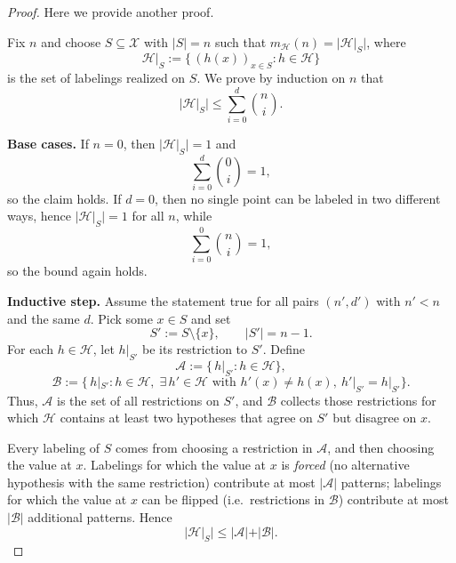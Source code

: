 \documentclass[../main]{subfiles}
\begin{document}
\begin{proof}
    Here we provide another proof.
    
    Fix $n$ and choose $S \subseteq \mathcal{X}$ with $|S|=n$
    such that $m_{\mathcal{H}}(n)=|\mathcal{H}|_S|$, where
    \begin{equation}
        \mathcal{H}|_S
        := \{\, (h(x))_{x\in S} : h\in\mathcal{H} \}
    \end{equation}
    is the set of labelings realized on $S$.
    We prove by induction on $n$ that
    \begin{equation}
        |\mathcal{H}|_S|
        \le \sum_{i=0}^{d} \binom{n}{i}.
    \end{equation}
    
    \textbf{Base cases.}
    If $n=0$, then $|\mathcal{H}|_S|=1$ and
    \begin{equation}
        \sum_{i=0}^{d} \binom{0}{i} = 1,
    \end{equation}
    so the claim holds.
    If $d=0$, then no single point can be labeled in two different ways,
    hence $|\mathcal{H}|_S|=1$ for all $n$, while
    \begin{equation}
        \sum_{i=0}^{0} \binom{n}{i} = 1,
    \end{equation}
    so the bound again holds.
    
    \textbf{Inductive step.}
    Assume the statement true for all pairs $(n',d')$ with $n' < n$
    and the same $d$. Pick some $x \in S$ and set
    \begin{equation}
        S' := S \setminus \{x\}, \qquad |S'| = n-1.
    \end{equation}
    For each $h\in\mathcal{H}$, let $h|_{S'}$ be its restriction to $S'$.
    Define
    \begin{equation}
        \mathcal{A}
        := \{\, h|_{S'} : h\in\mathcal{H} \},
    \end{equation}
    \begin{equation}
        \mathcal{B}
        := \bigl\{\, h|_{S'} : h\in\mathcal{H},\;
            \exists\,h' \in \mathcal{H}
            \text{ with } h'(x)\neq h(x),\ h'|_{S'}=h|_{S'} \bigr\}.
    \end{equation}
    Thus, $\mathcal{A}$ is the set of all restrictions on $S'$,
    and $\mathcal{B}$ collects those restrictions for which
    $\mathcal{H}$ contains at least two hypotheses that agree on $S'$
    but disagree on $x$.
    
    Every labeling of $S$ comes from choosing a restriction in $\mathcal{A}$,
    and then choosing the value at $x$.
    Labelings for which the value at $x$ is \emph{forced} (no alternative
    hypothesis with the same restriction) contribute at most $|\mathcal{A}|$
    patterns; labelings for which the value at $x$ can be flipped
    (i.e.\ restrictions in $\mathcal{B}$) contribute at most $|\mathcal{B}|$
    additional patterns.
    Hence
    \begin{equation}
        |\mathcal{H}|_S|
        \le |\mathcal{A}| + |\mathcal{B}|.
    \end{equation}
    

\end{proof}
\end{document}
